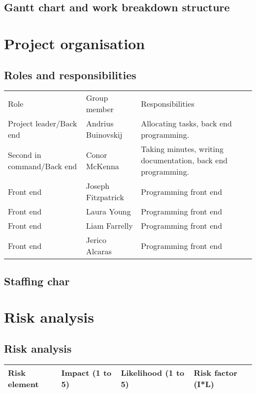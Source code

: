 \documentclass[a4paper, 12pt]{article}
\begin{document}
		\subsection{Gantt chart and work breakdown structure}
	\newpage
	\section{Project organisation}
		\subsection{Roles and responsibilities}
			\begin{tabular}{p{35 mm} p{35 mm} p{54 mm}}
				\toprule
					Role & Group member & Responsibilities \\
					Project leader/Back end & Andrius Buinovskij & Allocating tasks, back end programming. \\
					\midrule
					Second in command/Back end & Conor McKenna & Taking minutes, writing documentation, back end programming. \\
					\midrule
					Front end & Joseph Fitzpatrick & Programming front end \\
					\midrule
					Front end & Laura Young & Programming front end \\
					\midrule
					Front end & Liam Farrelly & Programming front end \\
					\midrule
					Front end & Jerico Alcaras & Programming front end \\
				\bottomrule
			\end{tabular}

		\subsection{Staffing char}

	\newpage
	\section{Risk analysis}
		\subsection{Risk analysis}
			\begin{tabular}{p{30 mm} p{30 mm} p{30 mm} p{30 mm}}
				\toprule
					Risk element & Impact (1 to 5) & Likelihood (1 to 5) & Risk factor (I*L) \\
				\bottomrule
			\end{tabular}
\end{document}

